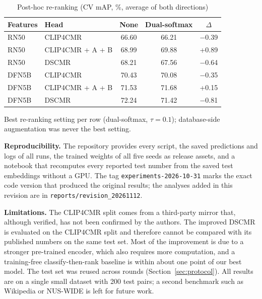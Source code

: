 \documentclass[conference]{IEEEtran}
\begin{document}
\begin{table}[t]
\centering
\caption{Post-hoc re-ranking (CV mAP, \%, average of both directions)}
\label{tab:rerank}
\small
\begin{tabular*}{\columnwidth}{@{\extracolsep{\fill}}llccc@{}}
\toprule
Features & Head & None & Dual-softmax & $\Delta$ \\
\midrule
RN50 & CLIP4CMR & 66.60 & 66.21 & $-$0.39 \\
RN50 & CLIP4CMR + A + B & 68.99 & 69.88 & +0.89 \\
RN50 & DSCMR & 68.21 & 67.56 & $-$0.64 \\
DFN5B & CLIP4CMR & 70.43 & 70.08 & $-$0.35 \\
DFN5B & CLIP4CMR + A + B & 71.53 & 71.68 & +0.15 \\
DFN5B & DSCMR & 72.24 & 71.42 & $-$0.81 \\
\bottomrule
\end{tabular*}

\vspace{2pt}
\parbox{\columnwidth}{\footnotesize Best re-ranking setting per row (dual-softmax, $\tau = 0.1$); database-side augmentation was never the best setting.}
\end{table}

\textbf{Reproducibility.} The repository provides every script, the saved predictions and logs of all runs, the trained weights of all five seeds as release assets, and a notebook that recomputes every reported test number from the saved test embeddings without a GPU. The tag \texttt{experiments-2026-10-31} marks the exact code version that produced the original results; the analyses added in this revision are in \texttt{reports/revision\_20261112}.

\textbf{Limitations.} The CLIP4CMR split comes from a third-party mirror that, although verified, has not been confirmed by the authors. The improved DSCMR is evaluated on the CLIP4CMR split and therefore cannot be compared with its published numbers on the same test set. Most of the improvement is due to a stronger pre-trained encoder, which also requires more computation, and a training-free classify-then-rank baseline is within about one point of our best model. The test set was reused across rounds (Section~\ref{sec:protocol}). All results are on a single small dataset with 200 test pairs; a second benchmark such as Wikipedia or NUS-WIDE is left for future work.
\end{document}
